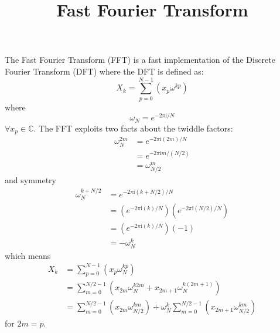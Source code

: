 \documentclass{article}
\begin{document}
%
\title{Fast Fourier Transform}
%
\maketitle
%
The Fast Fourier Transform (FFT) is a fast implementation of the Discrete Fourier Transform (DFT) where the DFT is defined as:
%
\begin {equation} \label {eq:dft}
X_k = \sum_{p = 0}^{N-1} (x_p \omega^{k p})
\end {equation}
%
where
%
\begin {equation} \label {eq:twiddle}
\omega_N = e^{-2 \pi \mathrm {i} / N}
\end {equation}
%
$\forall x_p \in \mathbb {C}$. The FFT exploits two facts about the twiddle factors:
%
\begin {equation}
\begin {aligned}
\omega_N^{2m} &= e^{-2 \pi \mathrm {i} (2m) / N}    \\
              &= e^{-2 \pi \mathrm {i} m / (N / 2)} \\
              &= \omega_{N/2}^m
\end {aligned}
\end {equation}
%
and symmetry
%
\begin {equation}
\begin {aligned}
\omega_N^{k + N/2} &= e^{-2 \pi \mathrm {i} (k + N/2) / N} \\
             &= \left (e^{-2 \pi \mathrm {i} (k) / N} \right) \left (e^{-2 \pi \mathrm {i} (N/2) / N} \right) \\
             &= \left (e^{-2 \pi \mathrm {i} (k) / N} \right) \left (-1 \right) \\
             &= -\omega_{N}^{k}
\end {aligned}
\end {equation}
%
which means
%
\begin {equation} \label {eq:xk}
\begin {aligned}
X_k &= \sum_{p = 0}^{N-1} (x_p \omega_N^{k p}) \\
    &= \sum_{m = 0}^{N/2-1} (x_{2m} \omega_N^{k 2 m} + x_{2m+1} \omega_N^{k (2 m + 1)}) \\
    &= \sum_{m = 0}^{N/2-1} (x_{2m} \omega_{N/2}^{k m}) + \omega_N^{k} \sum_{m = 0}^{N/2-1} (x_{2m+1} \omega_{N/2}^{km})
\end {aligned}
\end {equation}
%
for $2m = p$.
%
\end{document}
